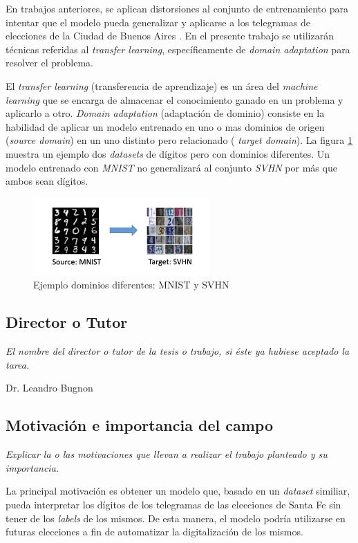 \documentclass[a4paper, twoside]{report}
\begin{document}
En trabajos anteriores, se aplican distorsiones al conjunto de entrenamiento
para intentar que el modelo pueda generalizar y aplicarse a los telegramas de
elecciones de la Ciudad de Buenos Aires \cite{Lamagna2016}. En el presente
trabajo se utilizar\'an t\'ecnicas referidas al {\it transfer learning},
espec\'ificamente de {\it domain adaptation} para resolver el problema.

El {\it transfer learning} (transferencia de aprendizaje) es un \'area del {\it
		machine learning} que se encarga de almacenar el conocimiento ganado en un
problema y aplicarlo a otro. {\it Domain adaptation} (adaptaci\'on de dominio)
consiste en la habilidad de aplicar un modelo entrenado en uno o mas dominios
de origen ({\it source domain}) en un uno distinto pero relacionado ({\it
		target domain}). La figura \ref{fig:mnist-to-svhn} muestra un ejemplo dos {\it
		datasets} de d\'igitos pero con dominios diferentes. Un modelo entrenado con
	{\it MNIST} no generalizar\'a al conjunto {\it SVHN} por m\'as que ambos sean
d\'igitos.

\begin{figure}[ht]
	\centering
	\includegraphics[width=0.6\textwidth]{mnist-to-svhn.png}
	\caption{Ejemplo dominios diferentes: MNIST y SVHN}
	\label{fig:mnist-to-svhn}
\end{figure}

\subsection*{Director o Tutor}
{\it El nombre del director o tutor de la tesis o trabajo, si éste ya
	hubiese aceptado la tarea.}

Dr. Leandro Bugnon

\subsection*{Motivación e importancia del campo}
{\it Explicar la o las motivaciones que llevan a realizar el trabajo planteado
	y su importancia.}

La principal motivaci\'on es obtener un modelo que, basado en un {\it dataset}
similiar, pueda interpretar los d\'igitos de los telegramas de las elecciones
de Santa Fe sin tener de los {\it labels} de los mismos. De esta manera, el
modelo podr\'ia utilizarse en futuras elecciones a fin de automatizar la
digitalizaci\'on de los mismos.
\end{document}
